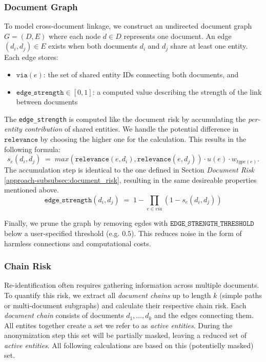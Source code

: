 \subsubsection{Document Graph}
To model cross-document linkage, we construct an undirected document graph $G=(D,E)$ where each node $d\in D$ represents one document. An edge $(d_i,d_j)\in E$ exists when both documents $d_i$ and $d_j$ share at least one entity. Each edge stores:
\begin{itemize}
\item $\texttt{via}(e)$: the set of shared entity IDs connecting both documents, and 
\item $\texttt{edge\_strength}\in[0,1]$: a computed value describing the strength of the link between documents
\end{itemize}
The \texttt{edge\_strength} is computed like the document risk by accumulating the \textit{per-entity contribution} of shared entities. We handle the potential difference in $\texttt{relevance}$ by choosing the higher one for the calculation. This results in the following formula:
\[
s_e(d_i, d_j) \; =\; max(\texttt{relevance}(e,d_i), \texttt{relevance}(e,d_j)) \cdot u(e) \cdot w_{type(e)}.
\]
The accumulation step is identical to the one defined in Section \textit{Document Risk} \ref{approach-subsubsec:document_risk}, resulting in the same desireable properties mentioned above.
\[ 
\texttt{edge\_strength}(d_i,d_j) \;=\; 1 - \prod_{e\in{via}}(1 - s_e(d_i,d_j))
\]

Finally, we prune the graph by removing egdes with $\texttt{EDGE\_STRENGTH\_THRESHOLD}$ below a user-specified threshold (e.g. $0.5$). This reduces noise in the form of harmless connections and computational costs. 
\subsubsection{Chain Risk}\label{approach-subsubsec:chain_risk}
Re-identification often requires gathering information across multiple documents. To quantify this risk, we extract all \textit{document chains} up to length $k$ (simple paths or multi-document subgraphs) and calculate their respective chain risk. Each \textit{document chain} consists of documents $d_1,\dots,d_k$ and the edges connecting them. All entites together create a set we refer to as \textit{active entities}. During the anonymization step this set will be partially masked, leaving a reduced set of \textit{active entities}. All following calculations are based on this (potentielly masked) set.

